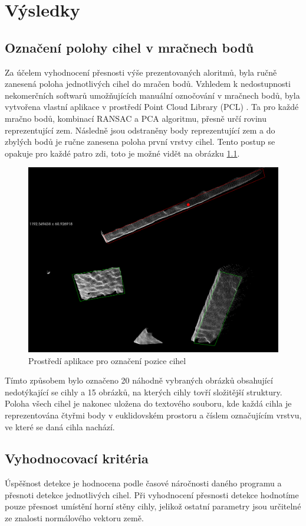 \documentclass[twoside]{ctuthesis}
\begin{document}
\chapter{Výsledky}
\label{sec:výsledky}
\section{Označení polohy cihel v mračnech bodů}
Za účelem vyhodnocení přesnosti výše prezentovaných aloritmů, byla ručně zanesená poloha jednotlivých cihel do mračen bodů. Vzhledem k nedostupnosti nekomerčních softwarů umožňujících manuální oznočování v mračnech bodů, byla vytvořena vlastní aplikace v prostředí Point Cloud Library (PCL) \cite{pcl}. Ta pro každé mračno bodů, kombinací RANSAC a PCA algoritmu, přesně určí rovinu reprezentující zem. Následně jsou odstraněny body reprezentující zem a do zbylých bodů je ručne zanesena poloha první vrstvy cihel. Tento postup se opakuje pro každé patro zdi, toto je možné vidět na obrázku \ref{fig:labler}.
\begin{figure}
    \centering
    \includegraphics[width = 0.8\linewidth]{pictures/labelr.png}
    \caption{Prostředí aplikace pro označení pozice cihel}
    \label{fig:labler}
\end{figure}
Tímto způsobem bylo označeno 20 náhodně vybraných obrázků obsahující nedotýkající se cihly a 15 obrázků, na kterých cihly tovří složitější struktury. Poloha všech cihel je nakonec uložena do textového souboru, kde každá cihla je reprezentována čtyřmi body v euklidovském prostoru a číslem označujícím vrstvu, ve které se daná cihla nachází.

\section{Vyhodnocovací kritéria}
Úspěšnost detekce je hodnocena podle časové náročnosti daného programu a přesnoti detekce jednotlivých cihel. Při vyhodnocení přesnosti detekce hodnotíme pouze přesnost umístění horní stěny cihly, jelikož ostatní parametry jsou určitelné ze znalosti normálového vektoru země.
\end{document}
